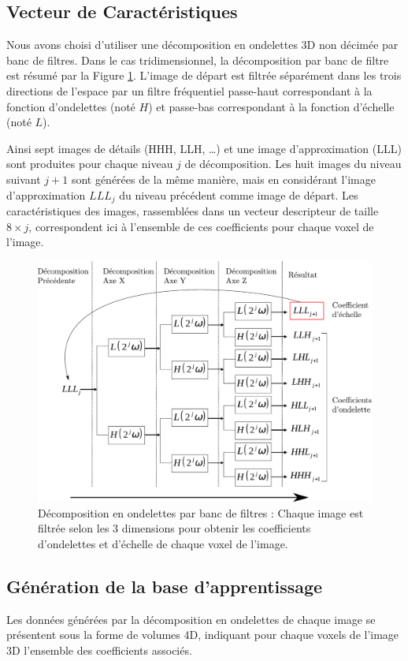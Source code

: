 \subsection{Vecteur de Caractéristiques}

Nous avons choisi d’utiliser une décomposition en ondelettes 3D non décimée par banc de filtres. Dans le cas tridimensionnel, la décomposition par banc de filtre est résumé par la Figure \ref{fig:ondelettes}. L’image de départ est filtrée séparément dans les trois directions de l’espace par un filtre fréquentiel passe-haut correspondant à la fonction d’ondelettes (noté $H$) et passe-bas correspondant à la fonction d’échelle (noté $L$). 

Ainsi sept images de détails (HHH, LLH, \dots) et une image d’approximation (LLL) sont produites pour chaque niveau $j$ de décomposition. Les huit images du niveau suivant $j+1$ sont générées de la même manière, mais en considérant l’image d’approximation $LLL_j$ du niveau précédent comme image de départ. Les caractéristiques des images, rassemblées dans un vecteur descripteur de taille $8\times j$, correspondent ici à l’ensemble de ces coefficients pour chaque voxel  de l’image. 

\begin{figure}
 \includegraphics[width=15cm]{images/decompHotell}
 \caption{Décomposition en ondelettes par banc de filtres : Chaque image est filtrée selon les 3 dimensions pour obtenir les coefficients d'ondelettes et d'échelle de chaque voxel de l'image.}
 \label{fig:ondelettes}
\end{figure}


\subsection{Génération de la base d'apprentissage}
Les données générées par la décomposition en ondelettes de chaque image se présentent sous la forme de volumes 4D, indiquant pour chaque voxels de l'image 3D l'ensemble des coefficients associés.

